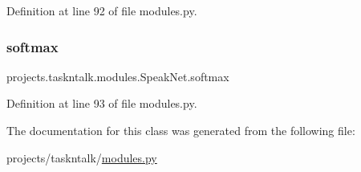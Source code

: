 Definition at line 92 of file modules.\+py.

\mbox{\label{classprojects_1_1taskntalk_1_1modules_1_1SpeakNet_aa6d9a715cdd73868cd0d57f4e5e240e0}} 
\subsubsection{\texorpdfstring{softmax}{softmax}}
{\footnotesize\ttfamily projects.\+taskntalk.\+modules.\+Speak\+Net.\+softmax}



Definition at line 93 of file modules.\+py.



The documentation for this class was generated from the following file\+:\begin{DoxyCompactItemize}
\item 
projects/taskntalk/\hyperlink{projects_2taskntalk_2modules_8py}{modules.\+py}\end{DoxyCompactItemize}
